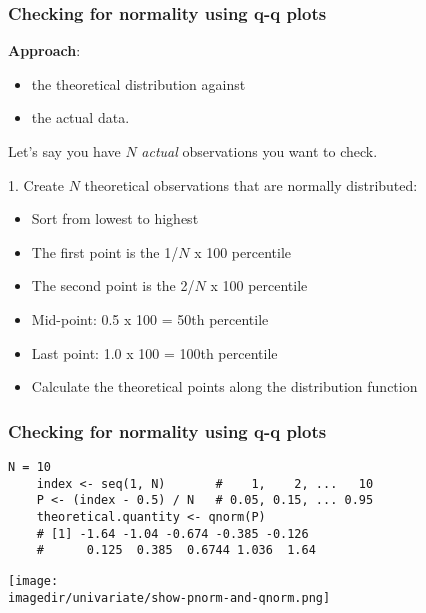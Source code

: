 \begin{frame}\frametitle{Checking for normality using q-q plots}

	\textbf{Approach}: {\color{myOrange}{compare}}
	\begin{itemize}
		\item	the theoretical distribution against
		\item	the actual data.
	\end{itemize}
	Let's say you have $N$ \emph{actual} observations you want to check.

	\vspace{16pt}
	1. Create $N$ theoretical observations that are normally distributed:
	\begin{itemize}
		\item	Sort from lowest to highest
		\item	The first point is the 1/$N$ x 100 percentile
		\item	The second point is the 2/$N$ x 100 percentile
		\item	Mid-point: 0.5 x 100 = 50th percentile
		\item	Last point: 1.0 x 100 = 100th percentile
		\item	Calculate the theoretical points along the distribution function
	\end{itemize}
\end{frame}

\begin{frame}[fragile]\frametitle{Checking for normality using q-q plots}

	\begin{lstlisting}[R]
	N = 10
	index <- seq(1, N)       #    1,    2, ...   10
	P <- (index - 0.5) / N   # 0.05, 0.15, ... 0.95
	theoretical.quantity <- qnorm(P)
	# [1] -1.64 -1.04 -0.674 -0.385 -0.126
	#      0.125  0.385  0.6744 1.036  1.64
	\end{lstlisting}
	\begin{center}
		\texttt{[image: \\imagedir/univariate/show-pnorm-and-qnorm.png]}
	\end{center}
\end{frame}

